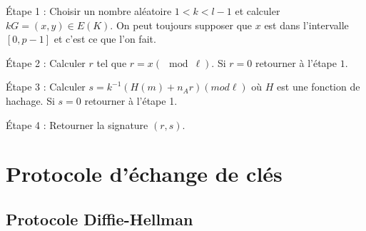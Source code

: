     \quad Étape 1 : Choisir un nombre aléatoire $1 < k < l-1$ et calculer $kG = (x,y) \in
    E(K)$. On peut toujours supposer que $x$ est dans l'intervalle $[0,p-1]$ et c'est ce que
    l'on fait.

    \quad Étape 2 : Calculer $r$ tel que $r = x (\mod \ell)$. Si $r = 0$ retourner à l'étape
    $1$.

    \quad Étape 3 : Calculer $s = k^{-1} ( H(m) + n_{A}r) (mod \ell)$ où $H$ est une fonction
    de hachage. Si $s= 0$ retourner à l'étape 1.

    \quad Étape 4 : Retourner la signature $(r,s)$.

    \quad

    \quad

    \quad

    \quad

    \quad

    \quad

\section{Protocole d'échange de clés}

\subsection{Protocole Diffie-Hellman}






